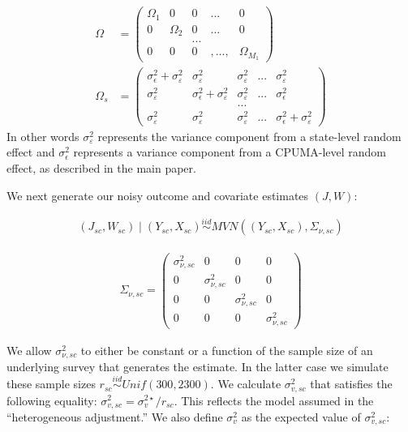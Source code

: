 \begin{align}
    \label{eqn:phecvariance1}\Omega &= \begin{pmatrix}
    \Omega_1 & 0 & 0 & ... & 0 \\
    0 & \Omega_2 & 0 &  ...  & 0 \\
    & & ...  & & \\
    0 & 0 & 0 &, ..., & \Omega_{M_1} 
    \end{pmatrix} \\
    \label{eqn:phecvariance2}\Omega_s &= \begin{pmatrix}
    \sigma^2_{\epsilon} + \sigma^2_{\varepsilon} & \sigma^2_{\varepsilon} & \sigma^2_{\varepsilon} & ... & \sigma^2_{\varepsilon} \\
    \sigma^2_{\varepsilon} & \sigma^2_{\epsilon} + \sigma^2_{\varepsilon} & \sigma^2_{\varepsilon}& ... & \sigma^2_{\epsilon} \\
    & & ... & & \\
    \sigma^2_{\varepsilon} & \sigma^2_{\varepsilon} & \sigma^2_{\varepsilon} & ... & \sigma^2_{\epsilon} + \sigma^2_{\varepsilon}
    \end{pmatrix}
\end{align}
%
In other words $\sigma^2_{\varepsilon}$ represents the variance component from a state-level random effect and $\sigma^2_{\epsilon}$ represents a variance component from a CPUMA-level random effect, as described in the main paper.

We next generate our noisy outcome and covariate estimates $(J, W)$:

\begin{align*}
(J_{sc}, W_{sc}) \mid (Y_{sc}, X_{sc}) \stackrel{iid}\sim MVN((Y_{sc}, X_{sc}), \Sigma_{\nu, sc})
\end{align*}

\begin{align*}
    \Sigma_{\nu, sc} = \begin{pmatrix}
    \sigma^2_{\nu, sc} & 0 & 0 & 0 \\
    0 & \sigma^2_{\nu, sc} & 0 & 0 \\
    0 & 0 & \sigma^2_{\nu, sc} & 0 \\
    0 & 0 & 0 & \sigma^2_{\nu, sc}
    \end{pmatrix}
\end{align*}

We allow $\sigma^2_{\nu, sc}$ to either be constant or a function of the sample size of an underlying survey that generates the estimate. In the latter case we simulate these sample sizes $r_{sc} \stackrel{iid}\sim Unif(300, 2300)$. We calculate $\sigma_{v, sc}^2$ that satisfies the following equality: $\sigma^2_{v, sc} = \sigma^{2\star}_v/r_{sc}$. This reflects the model assumed in the ``heterogeneous adjustment.'' We also define $\sigma_v^2$ as the expected value of $\sigma^2_{v, sc}$:

